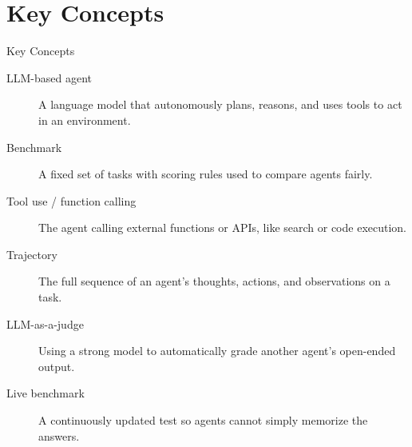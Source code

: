 \documentclass[10pt]{beamer}
\begin{document}
\section{Key Concepts}
\begin{frame}[allowframebreaks]{Key Concepts}
  \begin{description}
    \item[LLM-based agent] A language model that autonomously plans, reasons, and uses tools to act in an environment.
    \item[Benchmark] A fixed set of tasks with scoring rules used to compare agents fairly.
    \item[Tool use / function calling] The agent calling external functions or APIs, like search or code execution.
    \item[Trajectory] The full sequence of an agent's thoughts, actions, and observations on a task.
    \item[LLM-as-a-judge] Using a strong model to automatically grade another agent's open-ended output.
    \item[Live benchmark] A continuously updated test so agents cannot simply memorize the answers.
  \end{description}
\end{frame}
\end{document}
